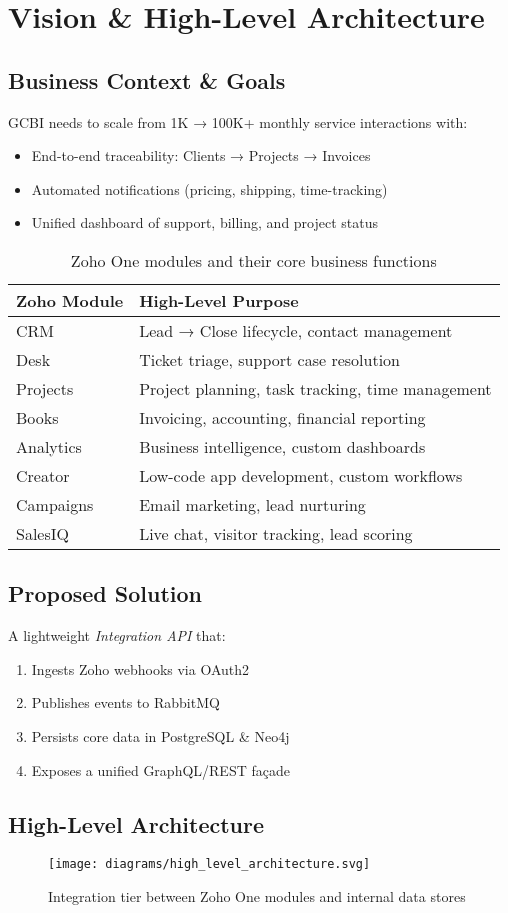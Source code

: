 \section{Vision \& High-Level Architecture}

\subsection{Business Context \& Goals}
GCBI needs to scale from 1K → 100K+ monthly service interactions with:
\begin{itemize}
  \item End-to-end traceability: Clients → Projects → Invoices
  \item Automated notifications (pricing, shipping, time-tracking)
  \item Unified dashboard of support, billing, and project status
\end{itemize}

\begin{table}[h]
\centering
\begin{tabular}{|l|l|}
\hline
\textbf{Zoho Module} & \textbf{High-Level Purpose} \\
\hline
CRM & Lead → Close lifecycle, contact management \\
\hline
Desk & Ticket triage, support case resolution \\
\hline
Projects & Project planning, task tracking, time management \\
\hline
Books & Invoicing, accounting, financial reporting \\
\hline
Analytics & Business intelligence, custom dashboards \\
\hline
Creator & Low-code app development, custom workflows \\
\hline
Campaigns & Email marketing, lead nurturing \\
\hline
SalesIQ & Live chat, visitor tracking, lead scoring \\
\hline
\end{tabular}
\caption{Zoho One modules and their core business functions}
\end{table}

\subsection{Proposed Solution}
A lightweight \emph{Integration API} that:
\begin{enumerate}
  \item Ingests Zoho webhooks via OAuth2
  \item Publishes events to RabbitMQ
  \item Persists core data in PostgreSQL \& Neo4j
  \item Exposes a unified GraphQL/REST façade
\end{enumerate}

\subsection{High-Level Architecture}
\begin{figure}[h]
  \centering
  \texttt{[image: diagrams/high\_level\_architecture.svg]}
  \caption{Integration tier between Zoho One modules and internal data stores}
\end{figure} 